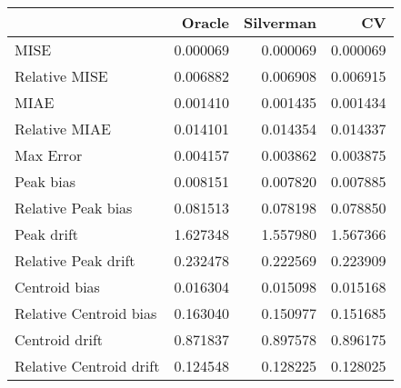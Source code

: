\begin{tabular}{lrrr}
  \hline
 & Oracle & Silverman & CV \\ 
  \hline
MISE & 0.000069 & 0.000069 & 0.000069 \\ 
  Relative MISE & 0.006882 & 0.006908 & 0.006915 \\ 
  MIAE & 0.001410 & 0.001435 & 0.001434 \\ 
  Relative MIAE & 0.014101 & 0.014354 & 0.014337 \\ 
  Max Error & 0.004157 & 0.003862 & 0.003875 \\ 
  Peak bias & 0.008151 & 0.007820 & 0.007885 \\ 
  Relative Peak bias & 0.081513 & 0.078198 & 0.078850 \\ 
  Peak drift & 1.627348 & 1.557980 & 1.567366 \\ 
  Relative Peak drift & 0.232478 & 0.222569 & 0.223909 \\ 
  Centroid bias & 0.016304 & 0.015098 & 0.015168 \\ 
  Relative Centroid bias & 0.163040 & 0.150977 & 0.151685 \\ 
  Centroid drift & 0.871837 & 0.897578 & 0.896175 \\ 
  Relative Centroid drift & 0.124548 & 0.128225 & 0.128025 \\ 
   \hline
\end{tabular}
